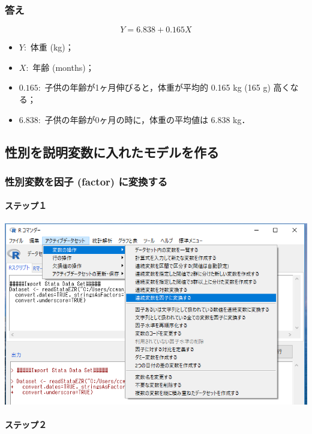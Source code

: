 \documentclass[11pt,]{problemset}
\providecommand{\tightlist}{%
  \setlength{\itemsep}{0pt}\setlength{\parskip}{0pt}}
\let\oldparagraph\paragraph
\renewcommand{\paragraph}[1]{\oldparagraph{#1}\mbox{}}
\begin{document}
\hypertarget{-3}{%
\subsubsection{答え}\label{-3}}

\[
Y = 6.838 + 0.165 X
\]

\begin{itemize}
\tightlist
\item
  \(Y:\) 体重 (kg)；
\item
  \(X:\) 年齢 (months)；
\item
  \(0.165:\) 子供の年齢が1ヶ月伸びると，体重が平均的 0.165 kg (165 g)
  高くなる；
\item
  \(6.838:\) 子供の年齢が0ヶ月の時に，体重の平均値は 6.838 kg．
\end{itemize}

\newpage
\vfill

\subsection{性別を説明変数に入れたモデルを作る}

\hypertarget{-factor-}{%
\subsubsection{性別変数を因子 (factor) に変換する}\label{-factor-}}

\hypertarget{-8}{%
\paragraph{ステップ１}\label{-8}}

\begin{center}\includegraphics[width=0.8\linewidth]{pic/sexfactor00} \end{center}

\hypertarget{-9}{%
\paragraph{ステップ２}\label{-9}}
\end{document}
